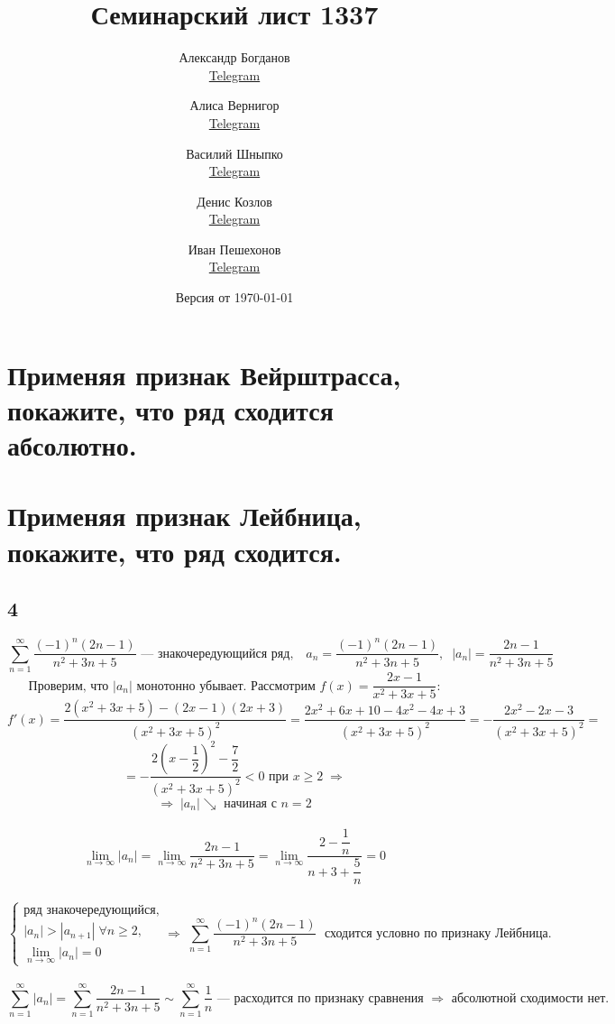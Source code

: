 \documentclass[a4paper,fleqn]{article}
\title{Семинарский лист 1337}
\author{
    Александр Богданов \\ \href{https://t.me/SphericalPotatoInVacuum}{Telegram} \and
    Алиса Вернигор     \\ \href{https://t.me/allisyonok}{Telegram} \and
    Василий Шныпко     \\ \href{https://t.me/yourvash}{Telegram} \and
    Денис Козлов       \\ \href{https://t.me/DKozl50}{Telegram} \and
    Иван Пешехонов     \\ \href{https://t.me/JohanDDC}{Telegram}
}
\date{Версия от {\ddmmyyyydate\today} \currenttime}
\begin{document}
    \maketitle
    \section*{Применяя признак Вейрштрасса, покажите, что ряд сходится абсолютно.}


    
    \section*{Применяя признак Лейбница, покажите, что ряд сходится.}
    \subsection*{4}
    \[ \sum_{n=1}^{\infty} \dfrac{(-1)^n (2n-1)}{n^2 + 3n + 5} \text{ --- знакочередующийся ряд}, \;\;\;
		 a_n = \dfrac{(-1)^n (2n-1)}{n^2 + 3n + 5}, \;\; |a_n|  = \dfrac{2n-1}{n^2 + 3n + 5} \]
		\[ \text{Проверим, что $|a_n|$ монотонно убывает. Рассмотрим $f(x) = \dfrac{2x-1}{x^2 + 3x + 5}$:} \]
		\[ f'(x) = \dfrac{2(x^2 + 3x + 5) - (2x-1)(2x+3)}{(x^2 + 3x + 5)^2} = 
		\dfrac{2x^2 + 6x + 10 - 4x^2 - 4x + 3}{(x^2 + 3x + 5)^2} = 
		-\dfrac{2x^2 - 2x - 3}{(x^2 + 3x + 5)^2} = \]
		\[ = -\dfrac{2\left(x - \dfrac12\right)^2 - \dfrac72}{(x^2 + 3x + 5)^2} < 0 \text{ при } x \ge 2  \;\Rightarrow \]
		\[ \Rightarrow \; |a_n| \searrow \text{ начиная с } n = 2 \]\\[-20 pt]
		\[ \lim_{n\to\infty} |a_n| = \lim_{n\to\infty} \dfrac{2n-1}{n^2 + 3n + 5} = \lim_{n\to\infty}\dfrac{2-\dfrac1n}{n + 3 + \dfrac5n} = 0 \]\\[-10 pt]
		\[ \left\{\begin{array}{l} 
		\text{ряд знакочередующийся},\\[5 pt]
		|a_n| > |a_{n+1}| \; \forall n \ge 2,\\[5 pt]
		\lim_{n\to\infty} |a_n| = 0
		\end{array}\right.
		\Rightarrow \; \sum_{n=1}^{\infty} \dfrac{(-1)^n (2n-1)}{n^2 + 3n + 5} \; \text{ сходится условно по признаку Лейбница.} \]\\[-5 pt]
		\[ \sum_{n=1}^{\infty} |a_n| = \sum_{n=1}^{\infty} \dfrac{2n-1}{n^2 + 3n + 5} \sim \sum_{n=1}^{\infty} \dfrac{1}{n} \text{ --- расходится по признаку сравнения } \Rightarrow \text{ абсолютной сходимости нет.} \]\\
\end{document}
